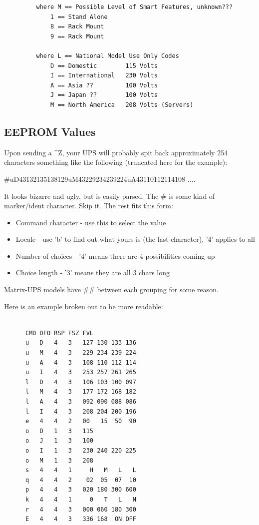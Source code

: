 {{{{{{{{{{{{{{{{{\begin{verbatim}
         where M == Possible Level of Smart Features, unknown???
             1 == Stand Alone
             8 == Rack Mount
             9 == Rack Mount
     
         where L == National Model Use Only Codes
             D == Domestic        115 Volts
             I == International   230 Volts
             A == Asia ??         100 Volts
             J == Japan ??        100 Volts
             M == North America   208 Volts (Servers)
\end{verbatim}
\normalsize

\label{EEPROM-Values}

\subsection*{EEPROM Values}

Upon sending a \^{}Z, your UPS will probably spit back approximately 254
characters something like the following (truncated here for the example):  

\#uD43132135138129uM43229234239224uA43110112114108 ....  

It looks bizarre and ugly, but is easily parsed. The \# is some kind of
marker/ident character. Skip it. The rest fits this form:  

\begin{itemize}
\item Command character - use this to select the value  
\item Locale - use 'b' to find out what yours is (the last character), '4'
   applies to all  
\item Number of choices - '4' means there are 4 possibilities coming up  
\item Choice length - '3' means they are all 3 chars long 
   \end{itemize}

Matrix-UPS models have \#\# between each grouping for some reason.  

Here is an example broken out to be more readable: 

\footnotesize
\begin{verbatim}
     
      CMD DFO RSP FSZ FVL
      u   D   4   3   127 130 133 136
      u   M   4   3   229 234 239 224
      u   A   4   3   108 110 112 114
      u   I   4   3   253 257 261 265
      l   D   4   3   106 103 100 097
      l   M   4   3   177 172 168 182
      l   A   4   3   092 090 088 086
      l   I   4   3   208 204 200 196
      e   4   4   2   00   15  50  90
      o   D   1   3   115
      o   J   1   3   100
      o   I   1   3   230 240 220 225
      o   M   1   3   208
      s   4   4   1     H   M   L   L
      q   4   4   2    02  05  07  10
      p   4   4   3   020 180 300 600
      k   4   4   1     0   T   L   N
      r   4   4   3   000 060 180 300
      E   4   4   3   336 168  ON OFF
     

\end{verbatim}}}}}}}}}}}}}}}}}}
